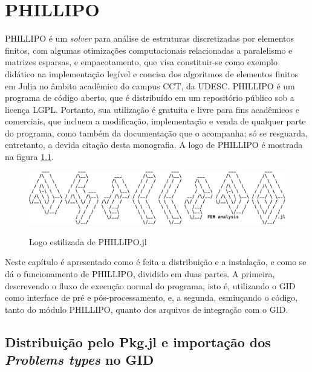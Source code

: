 \chapter{PHILLIPO}

PHILLIPO é um \emph{solver} para análise de estruturas discretizadas por elementos finitos, com algumas otimizações computacionais relacionadas a paralelismo e matrizes esparsas, e empacotamento, que visa constituir-se como exemplo didático na implementação legível e concisa dos algoritmos de elementos finitos em Julia no âmbito acadêmico do campus CCT, da UDESC. PHILLIPO é um programa de código aberto, que é distribuído em um repositório público\footnotemark[1]{} sob a licença LGPL\footnotemark[2]{}. Portanto, sua utilização é gratuita e livre para fins acadêmicos e comerciais, que incluem a modificação, implementação e venda de qualquer parte do programa, como também da documentação que o acompanha; só se resguarda, entretanto, a devida citação desta monografia. A logo de PHILLIPO é mostrada na figura \ref{fig:log_phillipo}.

\begin{figure}[hbtp!]
    \centering
    \caption{Logo estilizada de PHILLIPO.jl}
    \includegraphics[width = \textwidth]{Figuras/logo_phillipo.pdf}
    \label{fig:log_phillipo}
\end{figure}

Neste capítulo é apresentado como é feita a distribuição e a instalação, e como se dá o funcionamento de PHILLIPO, dividido em duas partes. A primeira, descrevendo o fluxo de execução normal do programa, isto é, utilizando o GID como interface de pré e pós-processamento, e, a segunda, esmiuçando o código, tanto do módulo PHILLIPO, quanto dos arquivos de integração com o GID.

\section{Distribuição pelo Pkg.jl e importação dos \emph{Problems types} no GID}

